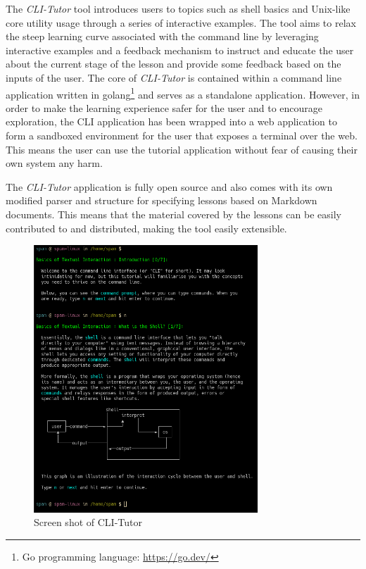 The \textit{CLI-Tutor} tool introduces users to topics such as shell basics and
Unix-like core utility usage through a series of interactive examples. The tool
aims to relax the steep learning curve associated with the command line by
leveraging interactive examples and a feedback mechanism to instruct and
educate the user about the current stage of the lesson and provide some
feedback based on the inputs of the user. The core of \textit{CLI-Tutor} is
contained within a command line application written in golang\footnote{Go
programming language: \href{https://go.dev/}{https://go.dev/}} and serves as a
standalone application. However, in order to make the learning experience safer
for the user and to encourage exploration, the CLI application has been wrapped
into a web application to form a sandboxed environment for the user that
exposes a terminal over the web. This means the user can use the tutorial
application without fear of causing their own system any harm. 

The \textit{CLI-Tutor} application is fully open source and also comes with its
own modified parser and structure for specifying lessons based on Markdown
documents. This means that the material covered by the lessons can be easily
contributed to and distributed, making the tool easily extensible.


\begin{figure}[htbp]
	\centering
	\includegraphics[width=0.75\textwidth]{img/clitutor}
	\caption{Screen shot of CLI-Tutor}
    \label{fig:clitutor}
\end{figure}

